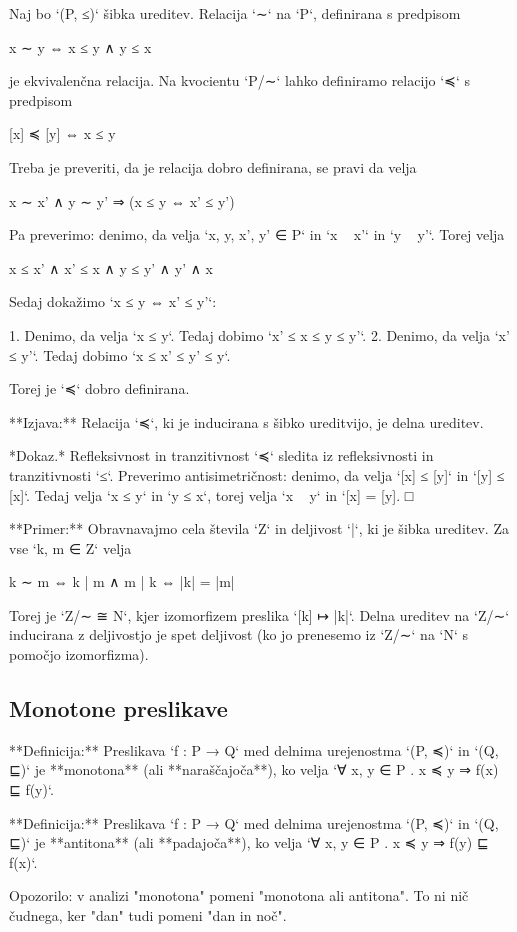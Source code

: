 Naj bo `(P, ≤)` šibka ureditev. Relacija `∼` na `P`, definirana s predpisom

    x ∼ y ⇔ x ≤ y ∧ y ≤ x

je ekvivalenčna relacija. Na kvocientu `P/∼` lahko definiramo relacijo `≼` s
predpisom

    [x] ≼ [y] ⇔ x ≤ y

Treba je preveriti, da je relacija dobro definirana, se pravi da velja

    x ∼ x' ∧ y ∼ y' ⇒ (x ≤ y ⇔ x' ≤ y')

Pa preverimo: denimo, da velja `x, y, x', y' ∈ P` in `x ~ x'` in `y ~ y'`.
Torej velja

    x ≤ x' ∧ x' ≤ x ∧ y ≤ y' ∧ y' ∧ x

Sedaj dokažimo `x ≤ y ⇔ x' ≤ y'`:

1. Denimo, da velja `x ≤ y`. Tedaj dobimo `x' ≤ x ≤ y ≤ y'`.
2. Denimo, da velja `x' ≤ y'`. Tedaj dobimo `x ≤ x' ≤ y' ≤ y`.

Torej je `≼` dobro definirana.

**Izjava:** Relacija `≼`, ki je inducirana s šibko ureditvijo, je delna ureditev.

*Dokaz.* Refleksivnost in tranzitivnost `≼` sledita iz refleksivnosti in tranzitivnosti `≤`. Preverimo antisimetričnost:
denimo, da velja `[x] ≤ [y]` in `[y] ≤ [x]`. Tedaj velja `x ≤ y` in `y ≤ x`, torej velja `x ~ y` in `[x] = [y]. □


**Primer:** Obravnavajmo cela števila `Z` in deljivost `|`, ki je šibka
ureditev. Za vse `k, m ∈ Z` velja

    k ∼ m ⇔ k | m ∧ m | k ⇔ |k| = |m|

Torej je `Z/∼ ≅ N`, kjer izomorfizem preslika `[k] ↦ |k|`. Delna ureditev na
`Z/∼` inducirana z deljivostjo je spet deljivost (ko jo prenesemo iz `Z/∼` na
`N` s pomočjo izomorfizma).


\subsection{Monotone preslikave}

**Definicija:** Preslikava `f : P → Q` med delnima urejenostma `(P, ≼)` in `(Q, ⊑)` je
**monotona** (ali **naraščajoča**), ko velja `∀ x, y ∈ P . x ≼ y ⇒ f(x) ⊑ f(y)`.

**Definicija:** Preslikava `f : P → Q` med delnima urejenostma `(P, ≼)` in `(Q, ⊑)` je
**antitona** (ali **padajoča**), ko velja `∀ x, y ∈ P . x ≼ y ⇒ f(y) ⊑ f(x)`.

Opozorilo: v analizi "monotona" pomeni "monotona ali antitona". To ni nič
čudnega, ker "dan" tudi pomeni "dan in noč".

